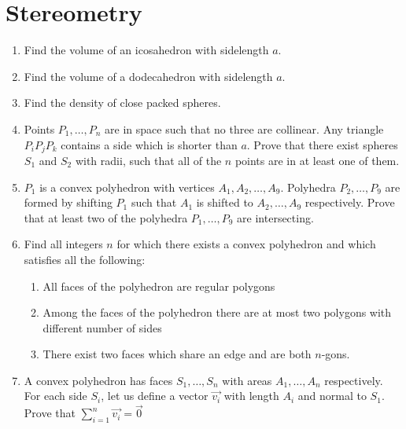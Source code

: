 \documentclass{article}
\begin{document}
\section{Stereometry}
\begin{enumerate}
\item
Find the volume of an icosahedron with sidelength $a$.

\item
Find the volume of a dodecahedron with sidelength $a$.

\item
Find the density of close packed spheres.

\item %
Points $P_1,\dots,P_n$ are in space such that no three are collinear. Any triangle $P_iP_jP_k$ contains a side which is shorter than $a$. Prove that there exist spheres $S_1$ and $S_2$ with radii, such that all of the $n$ points are in at least one of them.

\item %
$P_1$ is a convex polyhedron with vertices $A_1, A_2,\dots,A_9$. Polyhedra $P_2,\dots,P_9$ are formed by shifting $P_1$ such that $A_1$ is shifted to $A_2,\dots,A_9$ respectively. Prove that at least two of the polyhedra $P_1,\dots,P_9$ are intersecting.

\item %
Find all integers $n$ for which there exists a convex polyhedron and which satisfies all the following:
\begin{enumerate}
  \item All faces of the polyhedron are regular polygons
  \item Among the faces of the polyhedron there are at most two polygons with different number of sides
  \item There exist two faces which share an edge and are both $n$-gons.
\end{enumerate}

\item %
A convex polyhedron has faces $S_1,\dots,S_n$ with areas $A_1,\dots,A_n$ respectively. For each side $S_i$, let us define a vector $\vec{v_i}$ with length $A_i$ and normal to $S_1$. Prove that $\sum_{i=1}^n \vec{v_i} = \vec{0}$


\end{enumerate}
\end{document}
